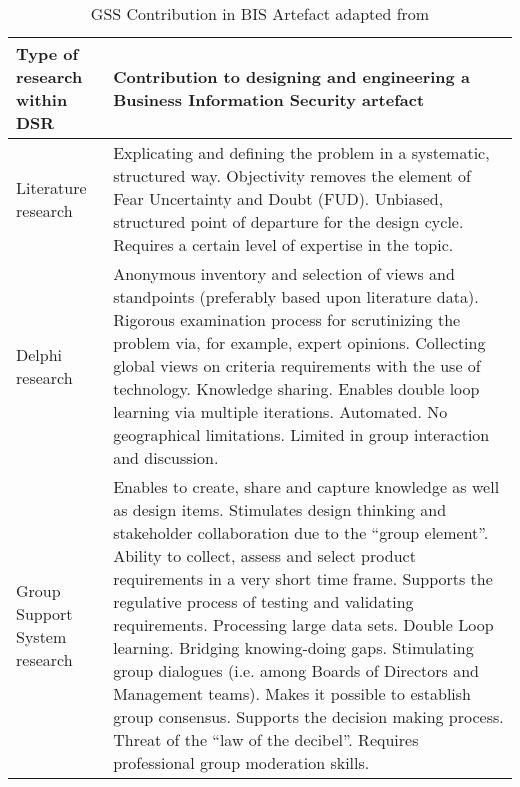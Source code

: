 


\begin{table}[ht]
    \setlength{\arrayrulewidth}{0.1mm}
    \setlength{\tabcolsep}{4pt}
    \renewcommand{\arraystretch}{1.0}
    
    \centering{}
    
    \caption{GSS Contribution in BIS Artefact adapted from \citep{bobbert2017exploring}}
    \label{table:GSS}
    
    \begin{tabularx}{0.96\linewidth}{|>{\columncolor[HTML]{ECB4E8}} p{1.5cm}|p{11.55cm}|} 
    
    \arrayrulecolor[HTML]{06000A}
    
        \hline
       
         \rowcolor[HTML]{BFCEED}     
         \textbf{Type of research within DSR} 
         & 
         \textbf{Contribution to designing and engineering a Business Information Security artefact}
         \\
        \hline
        Literature research 
        &
        Explicating and defining the problem in a systematic, structured way. Objectivity removes the
        element of Fear Uncertainty and Doubt (FUD). Unbiased, structured point of departure for the
        design cycle. Requires a certain level of expertise in the topic.
         \\
        \hline
        Delphi research
        &
        Anonymous inventory and selection of views and standpoints (preferably based upon
literature data). Rigorous examination process for scrutinizing the problem via, for example,
expert opinions. Collecting global views on criteria requirements with the use of technology.
Knowledge sharing. Enables double loop learning via multiple iterations. Automated. No
geographical limitations. Limited in group interaction and discussion.
         \\
        \hline
        Group Support System research 
        & 
        Enables to create, share and capture knowledge as well as design items.
        Stimulates design thinking and stakeholder collaboration due to the “group element”. 
        Ability to collect, assess and select product requirements in a very short time frame. 
        Supports the regulative process of testing and validating requirements. 
        Processing large data sets.
        Double Loop learning. 
        Bridging knowing-doing gaps. 
        Stimulating group dialogues (i.e. among Boards of Directors and Management teams).
        Makes it possible to establish group consensus. 
        Supports the decision making process. 
        Threat of the “law of the decibel”. 
        Requires professional group moderation skills.  	
        \\
       \hline
    \end{tabularx}

\end{table}








